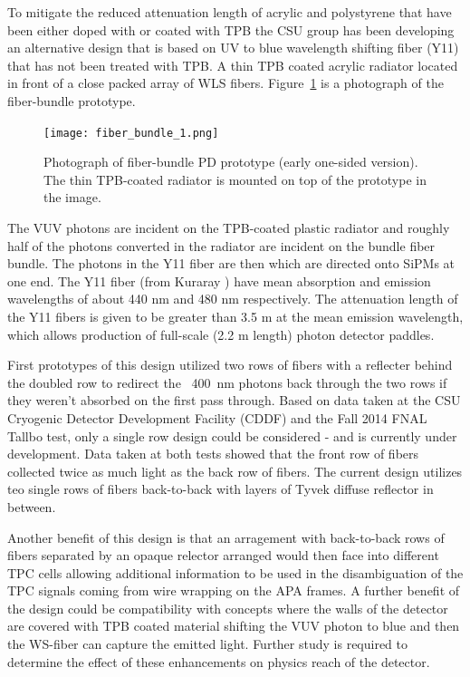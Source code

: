 To mitigate the reduced attenuation length of acrylic and polystyrene
that have been either doped with or coated with TPB the CSU group has
been developing an alternative design that is based on UV to blue
wavelength shifting fiber (Y11) that has not been treated with TPB.  A
thin TPB coated acrylic radiator located in front of a close packed
array of WLS fibers. Figure~\ref{fiber_bundle} is a photograph of the
fiber-bundle prototype. 

\begin{figure}[h!]
  \centering
  \texttt{[image: fiber\_bundle\_1.png]}
\caption[Fiber-bundle PD prototype (early one-sided
  version)]{Photograph of fiber-bundle PD prototype (early one-sided
  version). The thin TPB-coated radiator is mounted on top of the
  prototype in the image.}
\label{fiber_bundle}
\end{figure}

The VUV photons are incident on the TPB-coated plastic radiator and
roughly half of the photons converted in the radiator are incident on
the bundle fiber bundle. The photons in the Y11 fiber are then which
are directed onto SiPMs at one end. The Y11 fiber (from Kuraray ) have
mean absorption and emission wavelengths of about 440 nm and 480 nm
respectively.  The attenuation length of the Y11 fibers is given to be
greater than 3.5 m at the mean emission wavelength, which allows
production of full-scale (2.2 m length) photon detector paddles.

First prototypes of this design utilized two rows of fibers with a
reflecter behind the doubled row to redirect the ~400~nm photons back
through the two rows if they weren't absorbed on the first pass
through. Based on data taken at the CSU Cryogenic Detector Development
Facility (CDDF) and the Fall 2014 FNAL Tallbo test, only a single row
design could be considered - and is currently under development. Data
taken at both tests showed that the front row of fibers collected
twice as much light as the back row of fibers. The current design
utilizes teo single rows of fibers back-to-back with layers of Tyvek
diffuse reflector in between.

Another benefit of this design is that an arragement with back-to-back
rows of fibers separated by an opaque relector arranged would then
face into different TPC cells allowing additional information to be
used in the disambiguation of the TPC signals coming from wire
wrapping on the APA frames. A further benefit of the design could be
compatibility with concepts where the walls of the detector are
covered with TPB coated material shifting the VUV photon to blue and
then the WS-fiber can capture the emitted light. Further study is
required to determine the effect of these enhancements on physics
reach of the detector. 

